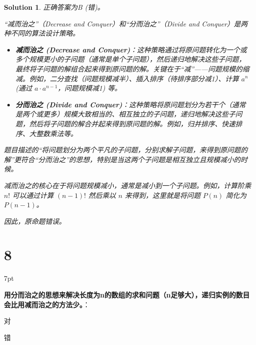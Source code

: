 \documentclass[UTF8]{report}
\newtheorem{solution}{Solution}
\theoremstyle{MyLineTheoremStyle} %
\theoremstyle{MyBlockTheoremStyle} %
\theoremstyle{MySubsubsectionStyle} %
\newenvironment{graybox}{%
        \def\FrameCommand{%
        \hspace{1pt}%
        {\color{gray}\small \vrule width 2pt}%
        {\color{graybox_color}\vrule width 4pt}%
        \colorbox{graybox_color}%
        }%
        \MakeFramed{\advance\hsize-\width\FrameRestore}%
        \noindent\hspace{-4.55pt}%
        \begin{adjustwidth}{}{7pt}%
        \vspace{2pt}\vspace{2pt}%
        }
        {%
        \vspace{2pt}\end{adjustwidth}\endMakeFramed%
        }
\begin{document}
\begin{solution}
正确答案为B (错)。

“减而治之”（Decrease and Conquer）和“分而治之”（Divide and Conquer）是两种不同的算法设计策略。
\begin{itemize}
    \item \textbf{减而治之 (Decrease and Conquer)}：这种策略通过将原问题转化为一个或多个规模更小的子问题（通常是单个子问题），然后递归地解决这些子问题，最终将子问题的解组合起来得到原问题的解。关键在于“减”——问题规模的缩减。例如，二分查找（问题规模减半）、插入排序（待排序部分减1）、计算 $a^n$ (通过 $a \cdot a^{n-1}$，问题规模减1) 等。
    \item \textbf{分而治之 (Divide and Conquer)}：这种策略将原问题划分为若干个（通常是两个或更多）规模大致相当的、相互独立的子问题，递归地解决这些子问题，然后将子问题的解合并起来得到原问题的解。例如，归并排序、快速排序、大整数乘法等。
\end{itemize}
题目描述的“将问题划分为两个平凡的子问题，分别求解子问题，来得到原问题的解”更符合“分而治之”的思想，特别是当这两个子问题是相互独立且规模减小的时候。

减而治之的核心在于将问题规模减小，通常是减小到一个子问题。例如，计算阶乘 $n!$ 可以通过计算 $(n-1)!$ 然后乘以 $n$ 来得到，这里就是将问题 $P(n)$ 简化为 $P(n-1)$。

因此，原命题错误。
\end{solution}

\section*{8}

\begin{graybox}
\textbf{用分而治之的思想来解决长度为n的数组的求和问题（n足够大），递归实例的数目会比用减而治之的方法少。}：
\begin{circledenum}
    \item 对
    \item 错
\end{circledenum}
\end{graybox}
\end{document}
